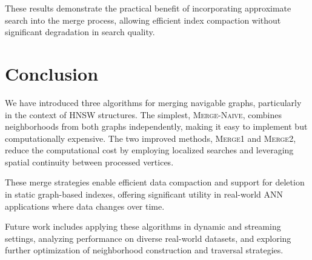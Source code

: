 \documentclass{article}
\begin{document}
These results demonstrate the practical benefit of incorporating approximate search into the merge process, allowing efficient index compaction without significant degradation in search quality.






\section{Conclusion}

We have introduced three algorithms for merging navigable graphs, particularly in the context of HNSW structures. The simplest, \textsc{Merge-Naive}, combines neighborhoods from both graphs independently, making it easy to implement but computationally expensive. The two improved methods, \textsc{Merge1} and \textsc{Merge2}, reduce the computational cost by employing localized searches and leveraging spatial continuity between processed vertices.

These merge strategies enable efficient data compaction and support for deletion in static graph-based indexes, offering significant utility in real-world ANN applications where data changes over time.

Future work includes applying these algorithms in dynamic and streaming settings, analyzing performance on diverse real-world datasets, and exploring further optimization of neighborhood construction and traversal strategies.





\end{document}
